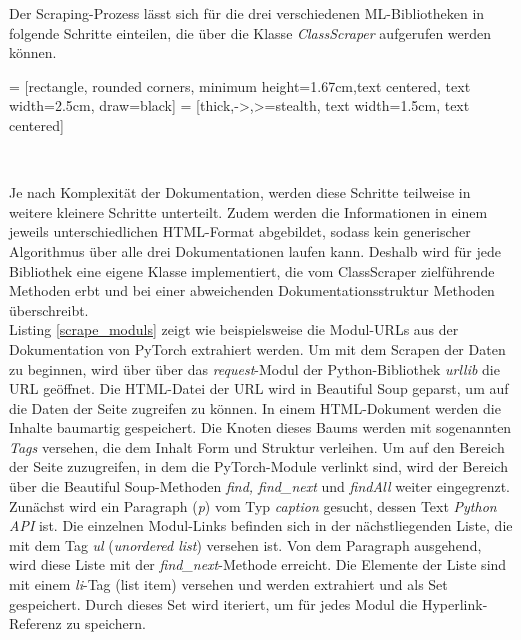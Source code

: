 \documentclass[german,bachelor]{swsLeipzig}
\begin{document}
\noindent Der Scraping-Prozess lässt sich für die drei verschiedenen ML-Bibliotheken in folgende Schritte einteilen, die über die Klasse
\textit{ClassScraper} aufgerufen werden können.

 = [rectangle, rounded corners, minimum height=1.67cm,text centered, text width=2.5cm, draw=black]
 = [thick,->,>=stealth, text width=1.5cm, text centered]

\begin{center}
\end{center}
\

\noindent Je nach Komplexität der Dokumentation, werden diese Schritte teilweise in weitere kleinere Schritte unterteilt.
Zudem werden die Informationen in einem jeweils unterschiedlichen HTML-Format abgebildet,
sodass kein generischer Algorithmus über alle drei Dokumentationen laufen kann.
Deshalb wird für jede Bibliothek eine eigene Klasse implementiert, die vom ClassScraper zielführende Methoden erbt und
bei einer abweichenden Dokumentationsstruktur Methoden überschreibt. \\

\noindent Listing \ref{scrape_moduls} zeigt wie beispielsweise die Modul-URLs aus der Dokumentation von PyTorch extrahiert werden.
Um mit dem Scrapen der Daten zu beginnen, wird über über das \textit{request}-Modul der Python-Bibliothek \textit{urllib} die URL geöffnet.
Die HTML-Datei der URL wird in Beautiful Soup geparst, um auf die Daten der Seite zugreifen zu können.
In einem HTML-Dokument werden die Inhalte baumartig gespeichert.
Die Knoten dieses Baums werden mit sogenannten \textit{Tags} versehen, die dem Inhalt Form und Struktur verleihen.
Um auf den Bereich der Seite zuzugreifen, in dem die PyTorch-Module verlinkt sind, wird der Bereich über die Beautiful Soup-Methoden
\textit{find, find\_next} und \textit{findAll} weiter eingegrenzt.
Zunächst wird ein Paragraph (\textit{p}) vom Typ \textit{caption} gesucht, dessen Text \textit{Python API} ist.
Die einzelnen Modul-Links befinden sich in der nächstliegenden Liste, die mit dem Tag \textit{ul} (\textit{unordered list})
versehen ist.
Von dem Paragraph ausgehend, wird diese Liste mit der \textit{find\_next}-Methode erreicht.
Die Elemente der Liste sind mit einem \textit{li}-Tag (list item) versehen und werden extrahiert und als Set gespeichert.
Durch dieses Set wird iteriert, um für jedes Modul die Hyperlink-Referenz zu speichern.\\
\end{document}
